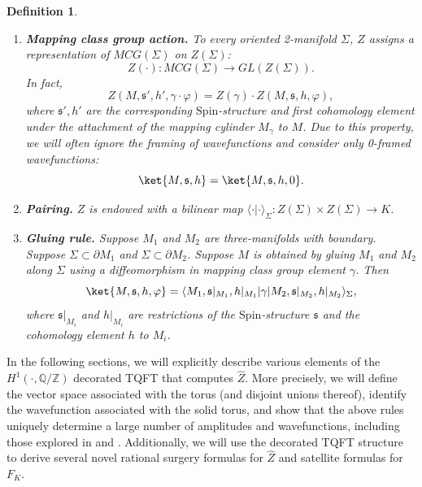 \documentclass{article}
\newcommand{\Z}{{\mathbb Z}}
\newcommand{\Q}{{\mathbb Q}}
\newtheorem{definition}{Definition}
\numberwithin{corollary}{theorem}
\numberwithin{corollary}{proposition}
\begin{document}
\begin{definition}
\begin{enumerate}
    \item \textbf{Mapping class group action.} To every oriented 2-manifold $\Sigma$, $Z$ assigns a representation of $MCG(\Sigma)$ on $Z(\Sigma)$: $$Z(\cdot):MCG(\Sigma) \rightarrow GL(Z(\Sigma)).$$ In fact, $$Z(M,\mathfrak{s}',h', \gamma \cdot \varphi) = Z(\gamma) \cdot Z(M,\mathfrak{s},h, \varphi), $$ 
    where $\mathfrak{s}', h'$ are the corresponding $\mathrm{Spin}$-structure and first cohomology element under the attachment of the mapping cylinder $M_\gamma$ to $M$. Due to this property, we will often ignore the framing of wavefunctions and consider only 0-framed wavefunctions:
    $$\ket{M,\mathfrak{s},h} = \ket{M,\mathfrak{s},h,0}.$$
    \item \textbf{Pairing.} $Z$ is endowed with a bilinear map $\langle \cdot |\cdot \rangle_\Sigma: Z(\Sigma)\times Z(\Sigma) \rightarrow K$. 
    \item \textbf{Gluing rule.} Suppose $M_{1}$ and $M_{2}$ are three-manifolds with boundary. Suppose $\Sigma \subset \partial M_{1}$ and $\Sigma \subset \partial M_{2}$. Suppose $M$ is obtained by gluing $M_{1}$ and $M_{2}$ along $\Sigma$ using a diffeomorphism in mapping class group element $\gamma$. Then 
$$\ket{M, \mathfrak{s}, h, \varphi} = \langle M_{1}, \mathfrak{s}\vert_{M_1}, h\vert_{M_1}|  \gamma | M_{2}, \mathfrak{s}\vert_{M_2}, h\vert_{M_2}\rangle_\Sigma,$$
where $\mathfrak{s}\vert_{M_i}$ and $h\vert_{M_i}$ are restrictions of the $\mathrm{Spin}$-structure $\mathfrak{s}$ and the cohomology element $h$ to $M_{i}$.  
\end{enumerate}
\end{definition}

In the following sections, we will explicitly describe various elements of the $H^{1}(\cdot, \Q/\Z)$ decorated TQFT that computes $\hat{Z}$. More precisely, we will define the vector space associated with the torus (and disjoint unions thereof), identify the wavefunction associated with the solid torus, and show that the above rules uniquely determine a large number of amplitudes and wavefunctions, including those explored in \cite{GM} and \cite{GPPV}. Additionally, we will use the decorated TQFT structure to derive several novel rational surgery formulas for $\hat{Z}$ and satellite formulas for $F_K$. 







\end{document}

